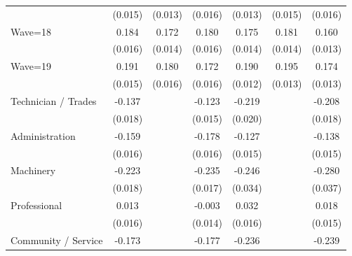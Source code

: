 {\begin{tabular}{l*{6}{c}}
                    &     (0.015)         &     (0.013)         &     (0.016)         &     (0.013)         &     (0.015)         &     (0.016)         \\
Wave=18             &       0.184\sym{***}&       0.172\sym{***}&       0.180\sym{***}&       0.175\sym{***}&       0.181\sym{***}&       0.160\sym{***}\\
                    &     (0.016)         &     (0.014)         &     (0.016)         &     (0.014)         &     (0.014)         &     (0.013)         \\
Wave=19             &       0.191\sym{***}&       0.180\sym{***}&       0.172\sym{***}&       0.190\sym{***}&       0.195\sym{***}&       0.174\sym{***}\\
                    &     (0.015)         &     (0.016)         &     (0.016)         &     (0.012)         &     (0.013)         &     (0.013)         \\
Technician / Trades &      -0.137\sym{***}&                     &      -0.123\sym{***}&      -0.219\sym{***}&                     &      -0.208\sym{***}\\
                    &     (0.018)         &                     &     (0.015)         &     (0.020)         &                     &     (0.018)         \\
Administration      &      -0.159\sym{***}&                     &      -0.178\sym{***}&      -0.127\sym{***}&                     &      -0.138\sym{***}\\
                    &     (0.016)         &                     &     (0.016)         &     (0.015)         &                     &     (0.015)         \\
Machinery           &      -0.223\sym{***}&                     &      -0.235\sym{***}&      -0.246\sym{***}&                     &      -0.280\sym{***}\\
                    &     (0.018)         &                     &     (0.017)         &     (0.034)         &                     &     (0.037)         \\
Professional        &       0.013         &                     &      -0.003         &       0.032\sym{**} &                     &       0.018         \\
                    &     (0.016)         &                     &     (0.014)         &     (0.016)         &                     &     (0.015)         \\
Community / Service &      -0.173\sym{***}&                     &      -0.177\sym{***}&      -0.236\sym{***}&                     &      -0.239\sym{***}\\

\end{tabular}}
